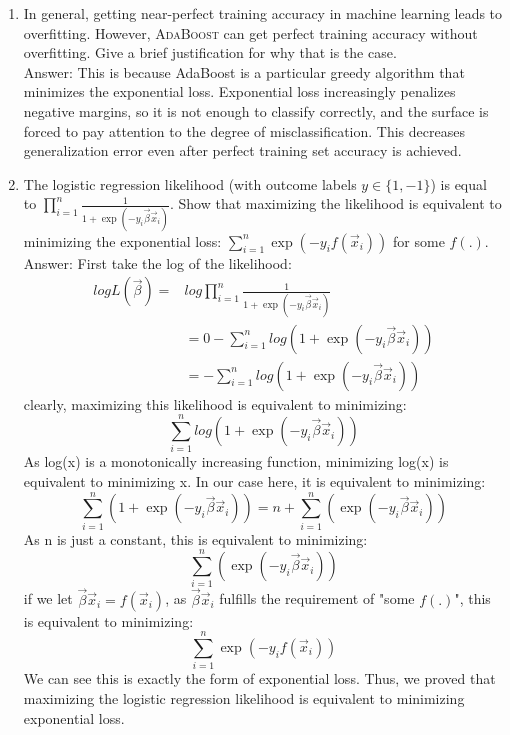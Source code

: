 \documentclass[11pt]{article}
\begin{document}
\begin{enumerate}[(1)]
\item In general, getting near-perfect training accuracy in machine learning
  leads to overfitting.  However, \textsc{AdaBoost} can get perfect training accuracy
  without overfitting.  Give a brief justification for why that is the case.\\
Answer: This is because AdaBoost is a particular greedy algorithm that minimizes the exponential loss. Exponential loss increasingly penalizes negative margins, so it is not enough to classify correctly, and the surface is forced to pay attention to the degree of misclassification. This decreases generalization error even after perfect training set accuracy is achieved.

\item The logistic regression likelihood (with outcome labels $y \in \{ 1, -1 \}$) is equal to $\prod_{i=1}^{n} \frac{1}{1 + \exp(- y_i \vec{\beta} \vec{x}_i)}$.  Show that maximizing the likelihood is equivalent to minimizing the exponential loss: $\sum_{i=1}^n \exp(- y_i f(\vec{x}_i))$ for some $f(.)$.\\
Answer: First take the log of the likelihood:
\begin{align*}
logL(\vec{\beta}) =& log \prod_{i=1}^{n} \frac{1}{1 + \exp(- y_i \vec{\beta} \vec{x}_i)}\\
&=0-\sum_{i=1}^nlog(1+\exp(- y_i \vec{\beta} \vec{x}_i))\\
&=-\sum_{i=1}^nlog(1+\exp(- y_i \vec{\beta} \vec{x}_i))
\end{align*}
clearly, maximizing this likelihood is equivalent to minimizing:
$$\sum_{i=1}^nlog(1+\exp(- y_i \vec{\beta} \vec{x}_i))$$
As log(x) is a monotonically increasing function, minimizing log(x) is equivalent to minimizing x. In our case here, it is equivalent to minimizing:
$$\sum_{i=1}^n(1+\exp(- y_i \vec{\beta} \vec{x}_i)) = n +\sum_{i=1}^n(\exp(- y_i \vec{\beta} \vec{x}_i)) $$
As n is just a constant, this is equivalent to minimizing:
$$\sum_{i=1}^n(\exp(- y_i \vec{\beta} \vec{x}_i)) $$
if we let  $\vec{\beta} \vec{x}_i = f(\vec{x}_i)$, as $\vec{\beta} \vec{x}_i$ fulfills the requirement of "some $f(.)$", this is equivalent to minimizing:
$$\sum_{i=1}^n\exp(- y_i f(\vec{x}_i)) $$
We can see this is exactly the form of exponential loss. Thus, we proved that maximizing the logistic regression likelihood is equivalent to minimizing exponential loss.
\end{enumerate}
\end{document}
